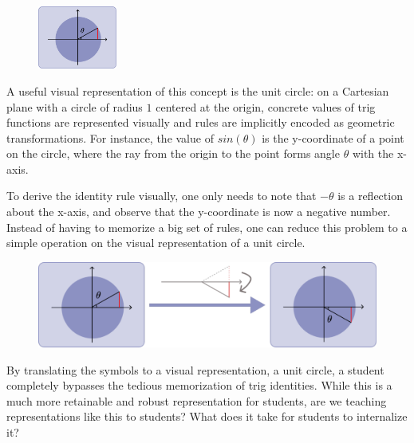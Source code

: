 \documentclass[12pt]{cmuthesis}
\begin{document}
\setlength{\columnsep}{1em}
\setlength{\intextsep}{0em}
\begin{figure}
\vspace{-10pt}
  \begin{center}
    \includegraphics[width=0.23\textwidth]{assets/prelude/unit-circle.pdf}
  \end{center}
\end{figure}

A useful visual representation of this concept is the unit circle: on a Cartesian plane with a circle of radius $1$ centered at the origin, concrete values of trig functions are represented visually and rules are implicitly encoded as geometric transformations. For instance, the value of $sin(\theta)$ is the y-coordinate of a point on the circle, where the ray from the origin to the point forms angle $\theta$ with the x-axis.

To derive the identity rule visually, one only needs to note that $-\theta$ is a reflection about the x-axis, and observe that the y-coordinate is now a negative number. Instead of having to memorize a big set of rules, one can reduce this problem to a simple operation on the visual representation of a unit circle.

\vspace{10pt}
\begin{figure}[h]
    \centering
    \includegraphics[width=0.70\linewidth]{assets/prelude/visual-transform.pdf}
\end{figure}

By translating the symbols to a visual representation, a unit circle, a student completely bypasses the tedious memorization of trig identities. While this is a much more retainable and robust representation for students, are we teaching representations like this to students? What does it take for students to internalize it? 
\end{document}
